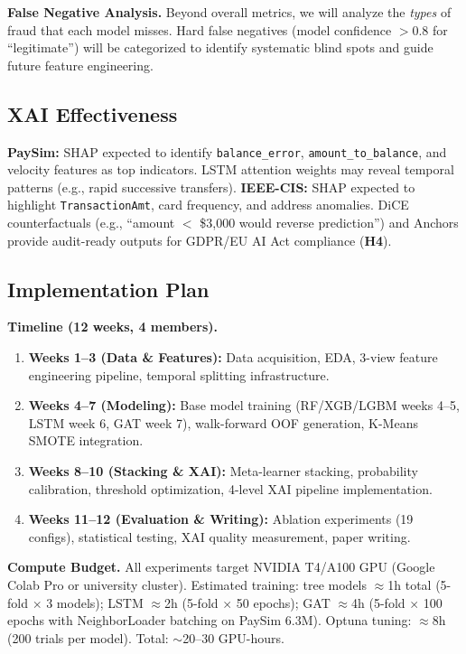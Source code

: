 \documentclass[10pt,a4paper,twocolumn]{article}
\begin{document}
\textbf{False Negative Analysis.} Beyond overall metrics, we will analyze the \emph{types} of fraud that each model misses. Hard false negatives (model confidence $>$0.8 for ``legitimate'') will be categorized to identify systematic blind spots and guide future feature engineering.

\subsection{XAI Effectiveness}

\textbf{PaySim:} SHAP expected to identify \texttt{balance\_error}, \texttt{amount\_to\_balance}, and velocity features as top indicators. LSTM attention weights may reveal temporal patterns (e.g., rapid successive transfers). \textbf{IEEE-CIS:} SHAP expected to highlight \texttt{TransactionAmt}, card frequency, and address anomalies. DiCE counterfactuals (e.g., ``amount $<$ \$3{,}000 would reverse prediction'') and Anchors provide audit-ready outputs for GDPR/EU AI Act compliance (\textbf{H4}).


\subsection{Implementation Plan}

\textbf{Timeline (12 weeks, 4 members).}
\begin{enumerate}[nosep]
    \item \textbf{Weeks 1--3 (Data \& Features):} Data acquisition, EDA, 3-view feature engineering pipeline, temporal splitting infrastructure.
    \item \textbf{Weeks 4--7 (Modeling):} Base model training (RF/XGB/LGBM weeks 4--5, LSTM week 6, GAT week 7), walk-forward OOF generation, K-Means SMOTE integration.
    \item \textbf{Weeks 8--10 (Stacking \& XAI):} Meta-learner stacking, probability calibration, threshold optimization, 4-level XAI pipeline implementation.
    \item \textbf{Weeks 11--12 (Evaluation \& Writing):} Ablation experiments (19 configs), statistical testing, XAI quality measurement, paper writing.
\end{enumerate}

\textbf{Compute Budget.} All experiments target NVIDIA T4/A100 GPU (Google Colab Pro or university cluster). Estimated training: tree models $\approx$1h total (5-fold $\times$ 3 models); LSTM $\approx$2h (5-fold $\times$ 50 epochs); GAT $\approx$4h (5-fold $\times$ 100 epochs with NeighborLoader batching on PaySim 6.3M). Optuna tuning: $\approx$8h (200 trials per model). Total: $\sim$20--30 GPU-hours.
\end{document}
